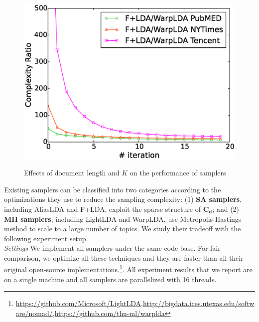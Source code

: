 \documentclass[10pt,journal,cspaper,compsoc]{IEEEtran}
\begin{document}
\begin{figure}[t]
{{				\includegraphics[width=\linewidth]{figures/complexity_ratio.eps}
		}}
		
		\caption{Effects of document length and $K$ on the performance of samplers}
		\label{fg:summary}
	\end{figure}
	
	Existing samplers can be classified
	into two categories according to the
	optimizations they use to reduce the sampling complexity:
	(1) {\bf SA samplers}, including
	AliasLDA and F+LDA, exploit the sparse structure of $\mathbf{C_d}$;
	and (2) {\bf MH samplers},
	including LightLDA and WarpLDA,
	use Metropolis-Hastings method to
	scale to a large number of topics.
	We study their tradeoff with the
	following experiment setup.
	\\

    \noindent
	{\large \em Settings}
	We implement all samplers under the same code base.
	For fair comparison, we optimize all these techniques and they are faster
	than all their original open-source implementations.\footnote{
		\scriptsize{\url{https://github.com/Microsoft/LightLDA},\url{http://bigdata.ices.utexas.edu/software/nomad/},\url{https://github.com/thu-ml/warplda}}}.
	All experiment results that we report are on a single machine and
	all samplers are parallelized with 16 threads.
	\\
\end{document}
